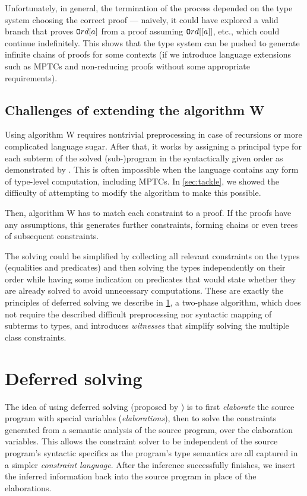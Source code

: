 Unfortunately, in general, the termination of the process depended on the type system choosing the correct proof --- naively, it could have explored a valid branch that proves $\mathtt{O}rd [a]$ from a proof assuming $\mathtt{O}rd [[a]]$, etc., which could continue indefinitely. This shows that the type system can be pushed to generate infinite chains of proofs for some contexts (if we introduce language extensions such as MPTCs and non-reducing proofs without some appropriate requirements).

\subsection{Challenges of extending the algorithm W}


Using algorithm W requires nontrivial preprocessing in case of recursions or more complicated language sugar. After that, it works by assigning a principal type for each subterm of the solved (sub-)program in the syntactically given order as demonstrated by \citet{jones1999typing}. This is often impossible when the language contains any form of type-level computation, including MPTCs. In \cref{sec:tackle}, we showed the difficulty of attempting to modify the algorithm to make this possible.

Then, algorithm W has to match each constraint to a proof. If the proofs have any assumptions, this generates further constraints, forming chains or even trees of subsequent constraints.

The solving could be simplified by collecting all relevant constraints on the types (equalities and predicates) and then solving the types independently on their order while having some indication on predicates that would state whether they are already solved to avoid unnecessary computations. These are exactly the principles of deferred solving we describe in \cref{defer_solve}, a two-phase algorithm, which does not require the described difficult preprocessing nor syntactic mapping of subterms to types, and introduces \emph{witnesses} that simplify solving the multiple class constraints.

\section{Deferred solving}
\label{defer_solve}

The idea of using deferred solving (proposed by \citet{vytiniotis2011outsidein}) is to first \emph{elaborate} the source program with special variables (\emph{elaborations}), then to solve the constraints generated from a semantic analysis of the source program, over the elaboration variables. This allows the constraint solver to be independent of the source program's syntactic specifics as the program's type semantics are all captured in a simpler \emph{constraint language}. After the inference successfully finishes, we insert the inferred information back into the source program in place of the elaborations.

